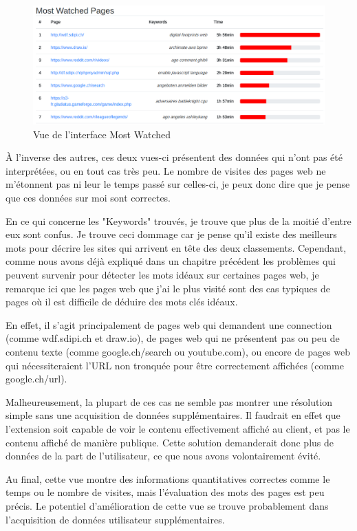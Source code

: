 		\begin{figure}[!h]
			\centering
			\includegraphics[width=1\textwidth]{images/results/critique-mostwatched}
			\caption{Vue de l'interface Most Watched}
			\label{critique-watched}
		\end{figure}

		À l'inverse des autres, ces deux vues-ci présentent des données qui n'ont pas été interprétées, ou en tout cas très peu. Le nombre de visites des pages web ne m'étonnent pas ni leur le temps passé sur celles-ci, je peux donc dire que je pense que ces données sur moi sont correctes.

		En ce qui concerne les "Keywords" trouvés, je trouve que plus de la moitié d'entre eux sont confus. Je trouve ceci dommage car je pense qu'il existe des meilleurs mots pour décrire les sites qui arrivent en tête des deux classements. Cependant, comme nous avons déjà expliqué dans un chapitre précédent les problèmes qui peuvent survenir pour détecter les mots idéaux sur certaines pages web, je remarque ici que les pages web que j'ai le plus visité sont des cas typiques de pages où il est difficile de déduire des mots clés idéaux.

		En effet, il s'agit principalement de pages web qui demandent une connection (comme wdf.sdipi.ch et draw.io), de pages web qui ne présentent pas ou peu de contenu texte (comme google.ch/search ou youtube.com), ou encore de pages web qui nécessiteraient l'URL non tronquée pour être correctement affichées (comme google.ch/url).

		Malheureusement, la plupart de ces cas ne semble pas montrer une résolution simple sans une acquisition de données supplémentaires. Il faudrait en effet que l'extension soit capable de voir le contenu effectivement affiché au client, et pas le contenu affiché de manière publique. Cette solution demanderait donc plus de données de la part de l'utilisateur, ce que nous avons volontairement évité.

		Au final, cette vue montre des informations quantitatives correctes comme le temps ou le nombre de visites, mais l'évaluation des mots des pages est peu précis. Le potentiel d'amélioration de cette vue se trouve probablement dans l'acquisition de données utilisateur supplémentaires.

